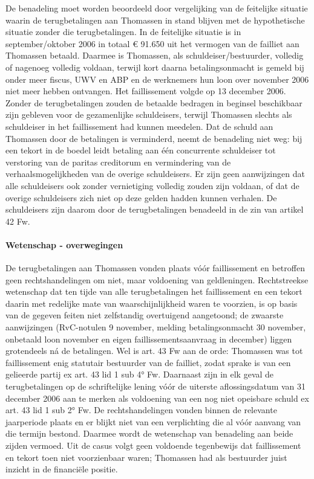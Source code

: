 \documentclass[
  dutch,
  a4paper,
]{article}
\begin{document}
De benadeling moet worden beoordeeld door vergelijking van de feitelijke situatie waarin de terugbetalingen aan Thomassen in stand blijven met de hypothetische situatie zonder die terugbetalingen. In de feitelijke situatie is in september/oktober 2006 in totaal € 91.650 uit het vermogen van de failliet aan Thomassen betaald. Daarmee is Thomassen, als schuldeiser/bestuurder, volledig of nagenoeg volledig voldaan, terwijl kort daarna betalingsonmacht is gemeld bij onder meer fiscus, UWV en ABP en de werknemers hun loon over november 2006 niet meer hebben ontvangen. Het faillissement volgde op 13 december 2006. Zonder de terugbetalingen zouden de betaalde bedragen in beginsel beschikbaar zijn gebleven voor de gezamenlijke schuldeisers, terwijl Thomassen slechts als schuldeiser in het faillissement had kunnen meedelen. Dat de schuld aan Thomassen door de betalingen is verminderd, neemt de benadeling niet weg: bij een tekort in de boedel leidt betaling aan één concurrente schuldeiser tot verstoring van de paritas creditorum en vermindering van de verhaalsmogelijkheden van de overige schuldeisers. Er zijn geen aanwijzingen dat alle schuldeisers ook zonder vernietiging volledig zouden zijn voldaan, of dat de overige schuldeisers zich niet op deze gelden hadden kunnen verhalen. De schuldeisers zijn daarom door de terugbetalingen benadeeld in de zin van artikel 42 Fw.

\paragraph{Wetenschap - overwegingen}\label{wetenschap---overwegingen-76}

De terugbetalingen aan Thomassen vonden plaats vóór faillissement en betroffen geen rechtshandelingen om niet, maar voldoening van geldleningen. Rechtstreekse wetenschap dat ten tijde van alle terugbetalingen het faillissement en een tekort daarin met redelijke mate van waarschijnlijkheid waren te voorzien, is op basis van de gegeven feiten niet zelfstandig overtuigend aangetoond; de zwaarste aanwijzingen (RvC-notulen 9 november, melding betalingsonmacht 30 november, onbetaald loon november en eigen faillissementsaanvraag in december) liggen grotendeels ná de betalingen. Wel is art. 43 Fw aan de orde: Thomassen was tot faillissement enig statutair bestuurder van de failliet, zodat sprake is van een gelieerde partij ex art. 43 lid 1 sub 4° Fw. Daarnaast zijn in elk geval de terugbetalingen op de schriftelijke lening vóór de uiterste aflossingsdatum van 31 december 2006 aan te merken als voldoening van een nog niet opeisbare schuld ex art. 43 lid 1 sub 2° Fw. De rechtshandelingen vonden binnen de relevante jaarperiode plaats en er blijkt niet van een verplichting die al vóór aanvang van die termijn bestond. Daarmee wordt de wetenschap van benadeling aan beide zijden vermoed. Uit de casus volgt geen voldoende tegenbewijs dat faillissement en tekort toen niet voorzienbaar waren; Thomassen had als bestuurder juist inzicht in de financiële positie.
\end{document}
